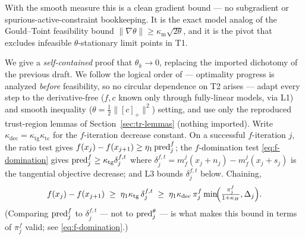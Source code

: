 \noindent With the smooth measure this is a clean gradient bound --- no subgradient
or spurious-active-constraint bookkeeping. It is the exact model analog of the
Gould--Toint feasibility bound $\|\nabla\theta\|\ge\kappa_{\mathrm m}\sqrt{2\theta}$,
and it is the pivot that excludes infeasible $\theta$-stationary limit points in T1.

We give a \emph{self-contained} proof that $\theta_k\to0$, replacing the imported
dichotomy of the previous draft. We follow the logical order of
\citet{GouldToint2010} --- optimality progress is analyzed \emph{before}
feasibility, so no circular dependence on T2 arises --- adapt every step to the
derivative-free ($f,c$ known only through fully-linear models, via L1) and smooth
inequality ($\theta=\tfrac12\|[c]_+\|^2$) setting, and use only the reproduced
trust-region lemmas of Section~\ref{sec:tr-lemmas} (nothing imported). Write
$\kappa_{\mathrm{dec}}=\kappa_{\mathrm{tg}}\kappa_{\mathrm{tc}}$ for the
$f$-iteration decrease constant. On a successful $f$-iteration $j$, the ratio test
gives $f(x_j)-f(x_{j+1})\ge\eta_1\operatorname{pred}^f_j$; the $f$-domination test
\eqref{eq:f-domination} gives $\operatorname{pred}^f_j\ge\kappa_{\mathrm{tg}}\delta^{f,t}_j$ where
$\delta^{f,t}_j=m_f^j(x_j+n_j)-m_f^j(x_j+s_j)$ is the tangential objective decrease;
and L3 bounds $\delta^{f,t}_j$ below. Chaining,
\begin{equation}
  \label{eq:f-decrease}
  f(x_j)-f(x_{j+1}) \;\ge\; \eta_1\kappa_{\mathrm{tg}}\,\delta^{f,t}_j
    \;\ge\; \eta_1\kappa_{\mathrm{dec}}\,\pi_j^f\min\!\Bigl(\tfrac{\pi_j^f}{1+\kappa_H},\Delta_j\Bigr).
\end{equation}
(Comparing $\operatorname{pred}^f_j$ to $\delta^{f,t}_j$ --- not to $\operatorname{pred}^\theta_j$ --- is what
makes this bound in terms of $\pi_j^f$ valid; see \eqref{eq:f-domination}.)

